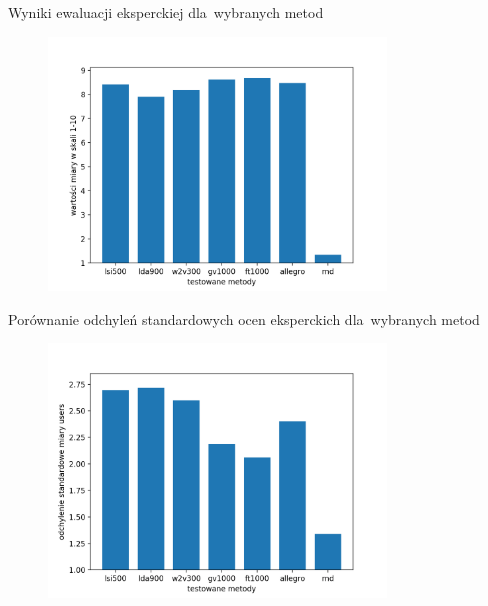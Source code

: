 \documentclass{beamer}
\begin{document}
	\begin{frame}{Wyniki ewaluacji eksperckiej dla~wybranych metod}
		\begin{figure}[H]
			\centering
			\includegraphics[width=0.8\textwidth]{img/results/lsi500_lda900_w2v300_gv1000_ft1000_allegro_rnd_users.png}
		\end{figure}
	\end{frame}
	\begin{frame}{Porównanie odchyleń standardowych ocen eksperckich dla~wybranych metod}
		\begin{figure}[H]
			\centering
			\includegraphics[width=0.8\textwidth]{img/results/lsi500_lda900_w2v300_gv1000_ft1000_allegro_rnd_users_std.png}
		\end{figure}
	\end{frame}
\end{document}
